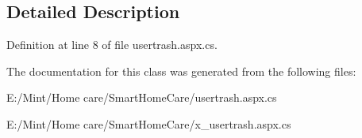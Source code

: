 \subsection{Detailed Description}


Definition at line 8 of file usertrash.\-aspx.\-cs.



The documentation for this class was generated from the following files\-:\begin{DoxyCompactItemize}
\item 
E\-:/\-Mint/\-Home care/\-Smart\-Home\-Care/usertrash.\-aspx.\-cs\item 
E\-:/\-Mint/\-Home care/\-Smart\-Home\-Care/x\-\_\-usertrash.\-aspx.\-cs\end{DoxyCompactItemize}
